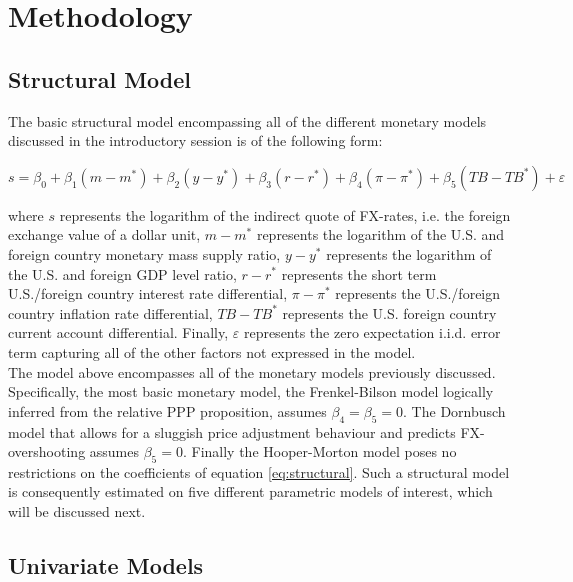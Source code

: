 \section{Methodology}
\label{sec:part2}

\subsection{Structural Model}
\label{sub:structural}

The basic structural model encompassing all of the different monetary
models discussed in the introductory session is of the following form:

\begin{equation} \label{eq:structural}
  s = \beta_{0} + \beta_{1}(m - m^{*}) + \beta_{2}(y-y^{*}) + \beta_{3}(r-r^{*})
  + \beta_{4}(\pi - \pi^{*}) + \beta_{5}(TB - TB^{*}) + \varepsilon
\end{equation}

where $s$ represents the logarithm of the indirect quote of FX-rates,
i.e. the foreign exchange value of a dollar unit, $m-m^{*}$ represents
the logarithm of the U.S. and foreign country monetary mass supply ratio,
$y-y^{*}$ represents the logarithm of the U.S. and foreign GDP level
ratio, $r-r^{*}$ represents the short term U.S./foreign country
interest rate differential, $\pi - \pi^{*}$ represents the
U.S./foreign country inflation rate differential, $TB - TB^{*}$
represents the U.S. foreign country current account differential.
Finally, $\varepsilon$ represents the zero expectation i.i.d. error
term capturing all of the
other factors not expressed in the model.\\
The model above encompasses all of the monetary models previously
discussed. Specifically, the most basic monetary model, the
Frenkel-Bilson model logically inferred from the relative PPP
proposition, assumes $\beta_{4} = \beta_{5} = 0$. The Dornbusch model
that allows for a sluggish price adjustment behaviour and predicts
FX-overshooting assumes $\beta_{5} = 0$. Finally the Hooper-Morton
model poses no restrictions on the coefficients of equation
\ref{eq:structural}. Such a structural model is consequently estimated
on five different parametric models of interest, which will be
discussed next.

\subsection{Univariate Models}
\label{sub:univariate}

